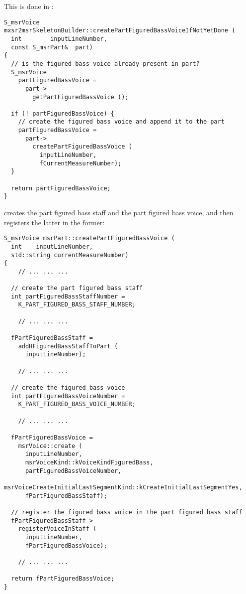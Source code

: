 This is done in :
\begin{lstlisting}[language=CPlusPlus]
S_msrVoice mxsr2msrSkeletonBuilder::createPartFiguredBassVoiceIfNotYetDone (
  int        inputLineNumber,
  const S_msrPart&  part)
{
  // is the figured bass voice already present in part?
  S_msrVoice
    partFiguredBassVoice =
      part->
        getPartFiguredBassVoice ();

  if (! partFiguredBassVoice) {
    // create the figured bass voice and append it to the part
    partFiguredBassVoice =
      part->
        createPartFiguredBassVoice (
          inputLineNumber,
          fCurrentMeasureNumber);
  }

  return partFiguredBassVoice;
}
\end{lstlisting}

 creates the part figured bass staff and the part figured bass voice, and then registers the latter in the former:
\begin{lstlisting}[language=CPlusPlus]
S_msrVoice msrPart::createPartFiguredBassVoice (
  int    inputLineNumber,
  std::string currentMeasureNumber)
{
	// ... ... ...

  // create the part figured bass staff
  int partFiguredBassStaffNumber =
    K_PART_FIGURED_BASS_STAFF_NUMBER;

	// ... ... ...

  fPartFiguredBassStaff =
    addHFiguredBassStaffToPart (
      inputLineNumber);

	// ... ... ...

  // create the figured bass voice
  int partFiguredBassVoiceNumber =
    K_PART_FIGURED_BASS_VOICE_NUMBER;

	// ... ... ...

  fPartFiguredBassVoice =
    msrVoice::create (
      inputLineNumber,
      msrVoiceKind::kVoiceKindFiguredBass,
      partFiguredBassVoiceNumber,
      msrVoiceCreateInitialLastSegmentKind::kCreateInitialLastSegmentYes,
      fPartFiguredBassStaff);

  // register the figured bass voice in the part figured bass staff
  fPartFiguredBassStaff->
    registerVoiceInStaff (
      inputLineNumber,
      fPartFiguredBassVoice);

	// ... ... ...

  return fPartFiguredBassVoice;
}
\end{lstlisting}


